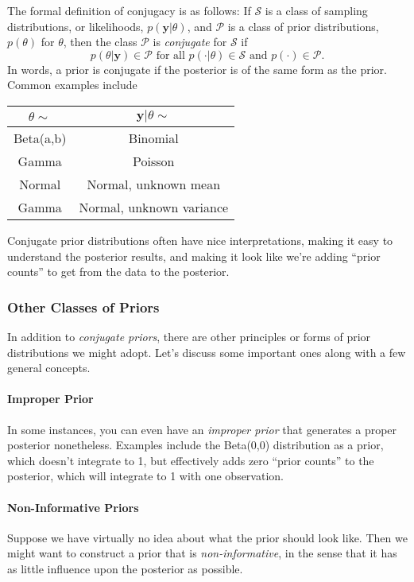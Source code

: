 \documentclass[12pt]{article}
\theoremstyle{plain}
\theoremstyle{definition}
\theoremstyle{remark}
\begin{document}
The formal definition of conjugacy is as follows: If $\mathcal{S}$ is
a class of sampling distributions, or likelihoods,
$p(\mathbf{y} | \theta)$, and $\mathcal{P}$ is a class of prior
distributions, $p(\theta)$ for $\theta$, then the class
$\mathcal{P}$ is \emph{conjugate} for $\mathcal{S}$ if
   \[ p(\theta | \mathbf{y}) \in \mathcal{P}
      \text{ for all } p(\cdot | \theta) \in
      \mathcal{S} \text{ and } p(\cdot) \in \mathcal{P}.\]
In words, a prior is conjugate if the posterior is of the same form
as the prior. Common examples include
\begin{center}
   \begin{tabular}{ | c | c |}
      \hline
      $\theta \sim$ & $\mathbf{y}|\theta \sim$ \\
      \hline
      Beta(a,b) & Binomial \\ \hline
      Gamma & Poisson \\ \hline
      Normal & Normal, unknown mean  \\\hline
      Gamma & Normal, unknown variance \\\hline
   \end{tabular}
\end{center}
Conjugate prior distributions often have nice interpretations, making
it easy to understand the posterior results, and making it look like
we're adding ``prior counts'' to get from the data to the posterior.

\subsubsection{Other Classes of Priors}

In addition to \emph{conjugate priors}, there are other principles or
forms of prior distributions we might adopt. Let's discuss some
important ones along with a few general concepts.

\paragraph{Improper Prior}
In some instances, you can even have an \emph{improper prior} that
generates a proper posterior nonetheless. Examples include the
Beta(0,0) distribution as a prior, which doesn't integrate to 1, but
effectively adds zero ``prior counts'' to the posterior, which will
integrate to 1 with one observation.

\paragraph{Non-Informative Priors}
Suppose we have virtually no idea about what the prior should look
like. Then we might want to construct a prior that is
\emph{non-informative}, in the sense that it has as little influence
upon the posterior as possible.
\end{document}

